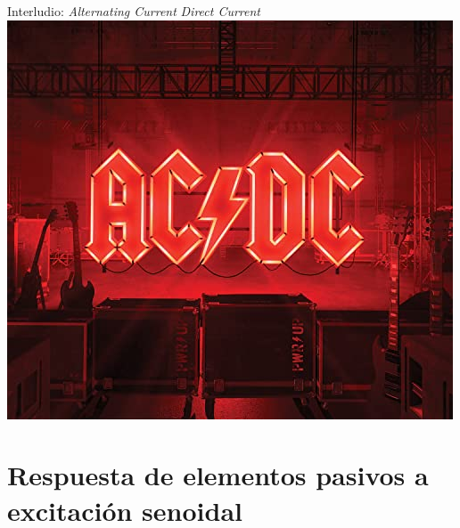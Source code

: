 \documentclass[aspectratio=169, usenames,svgnames,dvipsnames]{beamer}
\begin{document}
\begin{frame}{Interludio: \hspace{6mm}\textit{Alternating Current} \hspace{1mm}\faBolt \hspace{1mm} \textit{Direct Current}}    
		\centering \includegraphics[width=0.4\linewidth]{../figs/AC_DC_grupo.jpg}
\end{frame}


\section{Respuesta de elementos pasivos a excitación senoidal}
\end{document}
